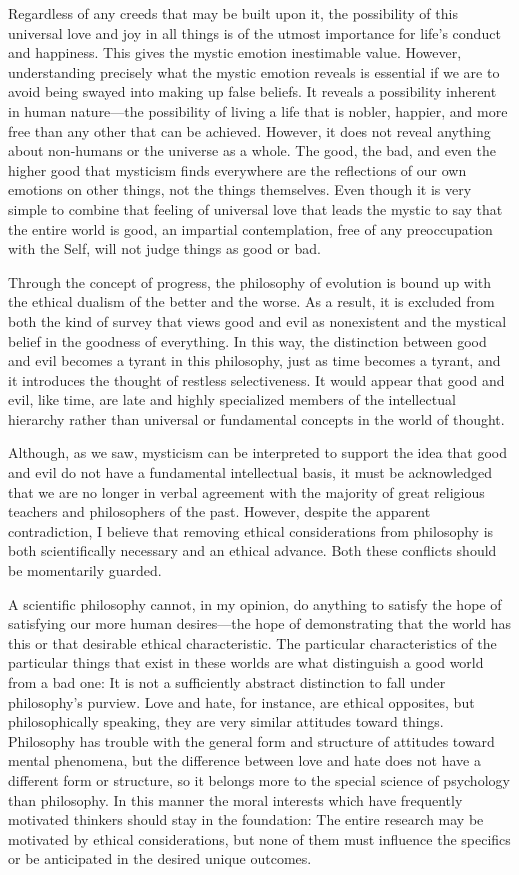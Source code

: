 \documentclass[a4paper,12pt]{book}[2004/02/16]
\theoremstyle{ilemma}
\theoremstyle{itheorem}
\theoremstyle{iother}
\theoremstyle{icorollary}
\theoremstyle{numcorollary}
\theoremstyle{idefinition}
\begin{document}
Regardless of any creeds that may be built upon it, the possibility of this universal love and joy in all things is of the utmost importance for life's conduct and happiness. This gives the mystic emotion inestimable value. However, understanding precisely what the mystic emotion reveals is essential if we are to avoid being swayed into making up false beliefs.
It reveals a possibility inherent in human nature—the possibility of living a life that is nobler, happier, and more free than any other that can be achieved. However, it does not reveal anything about non-humans or the universe as a whole. The good, the bad, and even the higher good that mysticism finds everywhere are the reflections of our own emotions on other things, not the things themselves. Even though it is very simple to combine that feeling of universal love that leads the mystic to say that the entire world is good, an impartial contemplation, free of any preoccupation with the Self, will not judge things as good or bad.

Through the concept of progress, the philosophy of evolution is bound up with the ethical dualism of the better and the worse. As a result, it is excluded from both the kind of survey that views good and evil as nonexistent and the mystical belief in the goodness of everything. In this way, the distinction between good and evil becomes a tyrant in this philosophy, just as time becomes a tyrant, and it introduces the thought of restless selectiveness. It would appear that good and evil, like time, are late and highly specialized members of the intellectual hierarchy rather than universal or fundamental concepts in the world of thought.

Although, as we saw, mysticism can be interpreted to support the idea that good and evil do not have a fundamental intellectual basis, it must be acknowledged that we are no longer in verbal agreement with the majority of great religious teachers and philosophers of the past. However, despite the apparent contradiction, I believe that removing ethical considerations from philosophy is both scientifically necessary and an ethical advance. Both these conflicts should be momentarily
guarded.

A scientific philosophy cannot, in my opinion, do anything to satisfy the hope of satisfying our more human desires—the hope of demonstrating that the world has this or that desirable ethical characteristic. The particular characteristics of the particular things that exist in these worlds are what distinguish a good world from a bad one:
It is not a sufficiently abstract distinction to fall under philosophy's purview. Love and hate, for instance, are ethical opposites, but philosophically speaking, they are very similar attitudes toward things. Philosophy has trouble with the general form and structure of attitudes toward mental phenomena, but the difference between love and hate does not have a different form or structure, so it belongs more to the special science of psychology than philosophy. In this manner the moral
interests which have frequently motivated thinkers should stay in the
foundation: The entire research may be motivated by ethical considerations, but none of them must influence the specifics or be anticipated in the desired unique outcomes.
\end{document}
